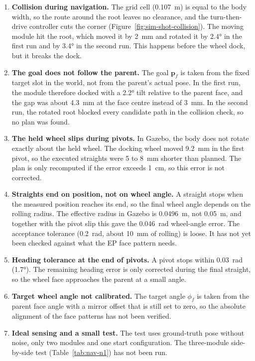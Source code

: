 \documentclass[12pt,a4paper]{article}
\begin{document}
\begin{enumerate}[topsep=2pt,itemsep=2pt,parsep=0pt,leftmargin=1.5em]
\item \textbf{Collision during navigation.} The grid cell (\SI{0.107}{m}) is equal to the body width, so the route around the root leaves no clearance, and the turn-then-drive controller cuts the corner (Figure~\ref{fig:sim-shot-collision}). The moving module hit the root, which moved it by \SI{2}{mm} and rotated it by \ang{2.4} in the first run and by \ang{3.4} in the second run. This happens before the wheel dock, but it breaks the dock.
\item \textbf{The goal does not follow the parent.} The goal $\mathbf{p}_f$ is taken from the fixed target slot in the world, not from the parent's actual pose. In the first run, the module therefore docked with a \ang{2.2} tilt relative to the parent face, and the gap was about \SI{4.3}{mm} at the face centre instead of \SI{3}{mm}. In the second run, the rotated root blocked every candidate path in the collision check, so no plan was found.
\item \textbf{The held wheel slips during pivots.} In Gazebo, the body does not rotate exactly about the held wheel. The docking wheel moved \SI{9.2}{mm} in the first pivot, so the executed straights were 5 to \SI{8}{mm} shorter than planned. The plan is only recomputed if the error exceeds \SI{1}{cm}, so this error is not corrected.
\item \textbf{Straights end on position, not on wheel angle.} A straight stops when the measured position reaches its end, so the final wheel angle depends on the rolling radius. The effective radius in Gazebo is \SI{0.0496}{m}, not \SI{0.05}{m}, and together with the pivot slip this gave the \SI{0.046}{rad} wheel-angle error. The acceptance tolerance (\SI{0.2}{rad}, about \SI{10}{mm} of rolling) is loose. It has not yet been checked against what the EP face pattern needs.
\item \textbf{Heading tolerance at the end of pivots.} A pivot stops within \SI{0.03}{rad} (\ang{1.7}). The remaining heading error is only corrected during the final straight, so the wheel face approaches the parent at a small angle.
\item \textbf{Target wheel angle not calibrated.} The target angle $\phi_f$ is taken from the parent face angle with a mirror offset that is still set to zero, so the absolute alignment of the face patterns has not been verified.
\item \textbf{Ideal sensing and a small test.} The test uses ground-truth pose without noise, only two modules and one start configuration. The three-module side-by-side test (Table~\ref{tab:nav-n1}) has not been run.
\end{enumerate}
\end{document}
